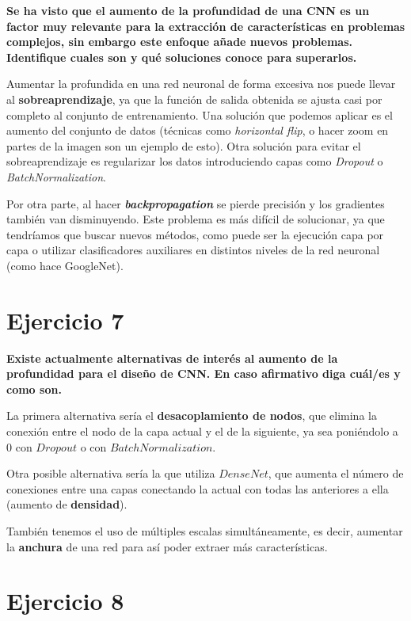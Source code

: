 \documentclass[11pt,a4paper]{article}
\begin{document}
\textbf{Se ha visto que el aumento de la profundidad de una CNN es un factor muy relevante para la extracción de características en problemas complejos, sin
embargo este enfoque añade nuevos problemas. Identifique cuales son y qué soluciones conoce para superarlos.}

Aumentar la profundida en una red neuronal de forma excesiva nos puede llevar al \textbf{sobreaprendizaje}, ya que la función de salida obtenida se ajusta casi por
completo al conjunto de entrenamiento. Una solución que podemos aplicar es el aumento del conjunto de datos (técnicas como \textit{horizontal flip}, o hacer zoom en
partes de la imagen son un ejemplo de esto). Otra solución para evitar el sobreaprendizaje es regularizar los datos introduciendo capas como \textit{Dropout} o
\textit{BatchNormalization}.

Por otra parte, al hacer \textbf{\textit{backpropagation}} se pierde precisión y los gradientes también van disminuyendo. Este problema es más difícil de solucionar,
ya que tendríamos que buscar nuevos métodos, como puede ser la ejecución capa por capa o utilizar clasificadores auxiliares en distintos niveles de la red neuronal
(como hace GoogleNet).


\section*{Ejercicio 7}

\textbf{Existe actualmente alternativas de interés al aumento de la profundidad para el diseño de CNN. En caso afirmativo diga cuál/es y como son.}

La primera alternativa sería el \textbf{desacoplamiento de nodos}, que elimina la conexión entre el nodo de la capa actual y el de la siguiente, ya sea poniéndolo
a 0 con $Dropout$ o con $BatchNormalization$.

Otra posible alternativa sería la que utiliza $DenseNet$, que aumenta el número de conexiones entre una capas conectando la actual con todas las anteriores a ella
(aumento de \textbf{densidad}).

También tenemos el uso de múltiples escalas simultáneamente, es decir, aumentar la \textbf{anchura} de una red para así poder extraer más características.



\section*{Ejercicio 8}
\end{document}
